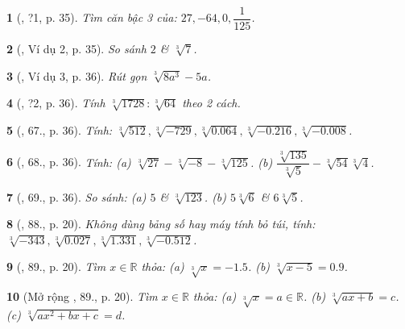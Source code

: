 \documentclass{article}
\newtheorem{baitoan}{}%
\begin{document}
\begin{baitoan}[\cite{SGK_Toan_9_tap_1}, ?1, p. 35]
	Tìm căn bậc 3 của: $27,-64,0,\dfrac{1}{125}$.
\end{baitoan}

\begin{baitoan}[\cite{SGK_Toan_9_tap_1}, Ví dụ 2, p. 35]
	So sánh $2$ \& $\sqrt[3]{7}$.
\end{baitoan}

\begin{baitoan}[\cite{SGK_Toan_9_tap_1}, Ví dụ 3, p. 36]
	Rút gọn $\sqrt[3]{8a^3} - 5a$.
\end{baitoan}

\begin{baitoan}[\cite{SGK_Toan_9_tap_1}, ?2, p. 36]
	Tính $\sqrt[3]{1728}:\sqrt[3]{64}$ theo 2 cách.
\end{baitoan}

\begin{baitoan}[\cite{SGK_Toan_9_tap_1}, 67., p. 36]
	Tính: $\sqrt[3]{512},\sqrt[3]{-729},\sqrt[3]{0.064},\sqrt[3]{-0.216},\sqrt[3]{-0.008}$.
\end{baitoan}

\begin{baitoan}[\cite{SGK_Toan_9_tap_1}, 68., p. 36]
	Tính: (a) $\sqrt[3]{27} - \sqrt[3]{-8} - \sqrt[3]{125}$. (b) $\dfrac{\sqrt[3]{135}}{\sqrt[3]{5}} - \sqrt[3]{54}\sqrt[3]{4}$.
\end{baitoan}

\begin{baitoan}[\cite{SGK_Toan_9_tap_1}, 69., p. 36]
	So sánh: (a) $5$ \& $\sqrt[3]{123}$. (b) $5\sqrt[3]{6}$ \& $6\sqrt[3]{5}$.
\end{baitoan}

\begin{baitoan}[\cite{SBT_Toan_9_tap_1}, 88., p. 20]
	Không dùng bảng số hay máy tính bỏ túi, tính: $\sqrt[3]{-343},\sqrt[3]{0.027},\sqrt[3]{1.331},\sqrt[3]{-0.512}$.
\end{baitoan}

\begin{baitoan}[\cite{SBT_Toan_9_tap_1}, 89., p. 20]
	Tìm $x\in\mathbb{R}$ thỏa: (a) $\sqrt[3]{x} = -1.5$. (b) $\sqrt[3]{x - 5} = 0.9$.
\end{baitoan}

\begin{baitoan}[Mở rộng \cite{SBT_Toan_9_tap_1}, 89., p. 20]
	Tìm $x\in\mathbb{R}$ thỏa: (a) $\sqrt[3]{x} = a\in\mathbb{R}$. (b) $\sqrt[3]{ax + b} = c$. (c) $\sqrt[3]{ax^2 + bx + c} = d$.
\end{baitoan}
\end{document}
